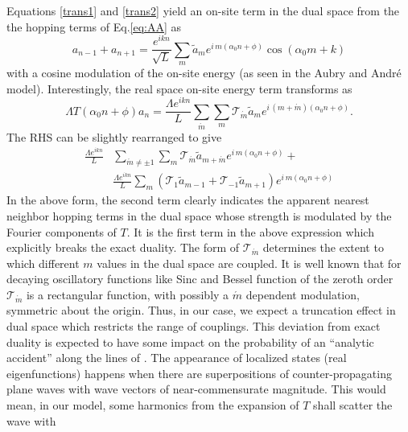Equations \eqref{trans1} and \eqref{trans2}  yield an on-site term in the dual space from the the hopping terms of Eq.\eqref{eq:AA} as  
\begin{equation}
\label{eq:Fspacesite}
a_{n-1} + a_{n+1} = \frac{e^{ikn}}{\sqrt L}\displaystyle\sum_m \tilde{a}_m e^{i\,m(\alpha_0 n + \phi)} \cos(\alpha_0 m + k)
\end{equation}
with a cosine modulation of the on-site energy  (as seen in
the Aubry and Andr\'e model). Interestingly, the real space on-site energy term transforms as
\begin{equation}
\Lambda  T(\alpha_0 n + \phi)a_n= \frac{\Lambda e^{ikn}}{L}\displaystyle\sum_{\acute{m}}\displaystyle\sum_m\mathcal{T}_{\acute{m}}\tilde{a}_m e^{i\,(m + \acute{m})(\alpha_0 n+\phi)}.   
\end{equation}
The RHS can be slightly rearranged to give 
\begin{equation}
\label{farTB}
\begin{split}
\frac{\Lambda e^{ikn}}{L}&\displaystyle\sum_{\acute{m}\neq\pm1}\displaystyle\sum_m\mathcal{T}_{\acute{m}}\tilde{a}_{m + \acute{m}} e^{i\,m(\alpha_0 n+\phi)} +\\ 
& \frac{\Lambda e^{ikn}}{L}\displaystyle\sum_m (\mathcal{T}_1\tilde{a}_{m-1} + \mathcal{T}_{-1}\tilde{a}_{m+1})e^{i\,m(\alpha_0 n + \phi)} 
\end{split}
\end{equation}
In the above form,  the second term clearly indicates the apparent nearest
neighbor hopping terms in the dual space whose strength is modulated
by the Fourier components of $T$. It is the first term in the above
expression which explicitly breaks the exact duality. The form of
$\mathcal{T}_{\acute{m}}$ determines the extent to which different
$m$ values in the dual space are coupled.  It is well known
that for decaying oscillatory functions like Sinc and Bessel function
of the zeroth order $\mathcal{T}_{\acute{m}}$ is a rectangular
function,   with possibly a $\acute{m}$ dependent modulation,  symmetric
about the origin. Thus,  in our case, we expect a truncation effect in
dual space which restricts the range of couplings. This deviation from
exact duality is expected to have some impact on the
probability of an ``analytic accident'' along the lines of \parencite{aubry1980analyticity}.
The appearance of localized states (real eigenfunctions) happens when
there are superpositions of counter-propagating plane waves with
wave vectors of near-commensurate magnitude. This would mean,  in our
model, some harmonics from the expansion of $T$ shall scatter the wave with

